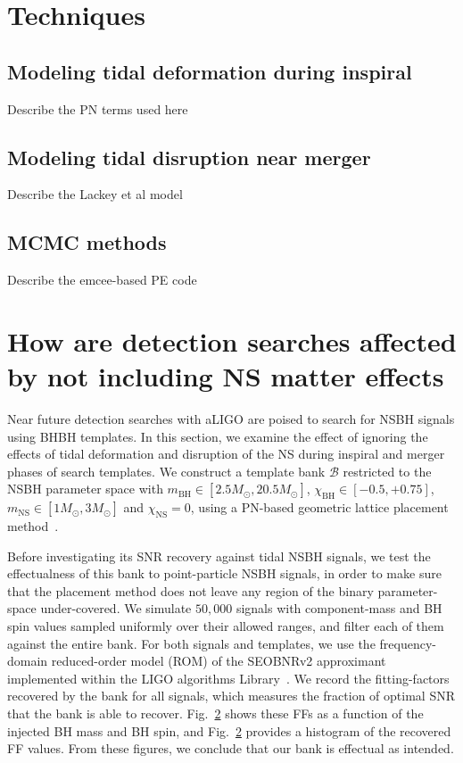 \documentclass[aps,prd,amsmath,floats,floatfix, twocolumn,
superscriptaddress,nofootinbib,showpacs]{revtex4-1}
\newcommand{\chibh}{\chi_\mathrm{BH}}
\newcommand{\mbh}{m_\mathrm{BH}}
\newcommand{\mns}{m_\mathrm{NS}}
\begin{document}
\section{Techniques}
\subsection{Modeling tidal deformation during inspiral}
Describe the PN terms used here

\subsection{Modeling tidal disruption near merger}
Describe the Lackey et al model

\subsection{MCMC methods}
Describe the emcee-based PE code

\section{How are detection searches affected by not including NS matter effects}

Near future detection searches with aLIGO are poised to search for NSBH
signals using BHBH templates. In this section, we examine the effect of ignoring
the effects of tidal deformation and disruption of the NS during inspiral and 
merger phases of search templates. We construct a template bank $\mathcal{B}$ 
restricted to the NSBH parameter space with $\mbh\in[2.5M_\odot, 20.5M_\odot]$, 
$\chibh\in[-0.5, +0.75]$, $\mns\in[1M_\odot,3M_\odot]$ and $\chi_\mathrm{NS}=0$,
using a PN-based geometric lattice placement method~\cite{Harry:2013tca}. 


Before investigating its SNR recovery against tidal NSBH signals, we test the 
effectualness of this bank to point-particle NSBH signals,
in order to make sure that the placement method does not leave any region of
the binary parameter-space under-covered. We simulate $50,000$ signals with 
component-mass and BH spin values
sampled uniformly over their allowed ranges, and filter each of them against
the entire bank. For both signals and templates, we use the frequency-domain 
reduced-order model (ROM) of the SEOBNRv2 approximant~\cite{Purrer:2014} 
implemented within the LIGO algorithms Library~\cite{lal}. We record the 
fitting-factors~\cite{FittingFactorApostolatos} recovered by the bank for all
signals, which measures the fraction of optimal SNR that the bank is able
to recover. Fig.~\ref{} shows these FFs as a function of the injected
BH mass and BH spin, and Fig.~\ref{} provides a histogram of the recovered FF 
values. From these figures, we conclude that our bank is effectual as intended.
\end{document}
